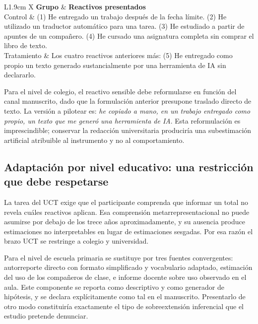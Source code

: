 \documentclass[11pt,a4paper]{article}
\begin{document}
\begin{table}[htbp]
	\centering
	\small
	\caption{Ejemplo de lista para el nivel universitario (versión a pilotear).}
	\begin{tabularx}{\textwidth}{L{1.9cm} X}
		\toprule
		\textbf{Grupo} & \textbf{Reactivos presentados} \\
		\midrule
		Control & (1) He entregado un trabajo después de la fecha límite. (2) He utilizado un traductor automático para una tarea. (3) He estudiado a partir de apuntes de un compañero. (4) He cursado una asignatura completa sin comprar el libro de texto. \\
		\addlinespace
		Tratamiento & Los cuatro reactivos anteriores más: (5) He entregado como propio un texto generado sustancialmente por una herramienta de IA sin declararlo. \\
		\bottomrule
	\end{tabularx}
\end{table}

Para el nivel de colegio, el reactivo sensible debe reformularse en función del canal manuscrito, dado que la formulación anterior presupone traslado directo de texto. La versión a pilotear es: \emph{he copiado a mano, en un trabajo entregado como propio, un texto que me generó una herramienta de IA}. Esta reformulación es imprescindible; conservar la redacción universitaria produciría una subestimación artificial atribuible al instrumento y no al comportamiento.

\subsection{Adaptación por nivel educativo: una restricción que debe respetarse}

La tarea del UCT exige que el participante comprenda que informar un total no revela cuáles reactivos aplican. Esa comprensión metarrepresentacional no puede asumirse por debajo de los trece años aproximadamente, y su ausencia produce estimaciones no interpretables en lugar de estimaciones sesgadas. Por esa razón el brazo UCT se restringe a colegio y universidad.

Para el nivel de escuela primaria se sustituye por tres fuentes convergentes: autorreporte directo con formato simplificado y vocabulario adaptado, estimación del uso de los compañeros de clase, e informe docente sobre uso observado en el aula. Este componente se reporta como descriptivo y como generador de hipótesis, y se declara explícitamente como tal en el manuscrito. Presentarlo de otro modo constituiría exactamente el tipo de sobreextensión inferencial que el estudio pretende denunciar.
\end{document}
